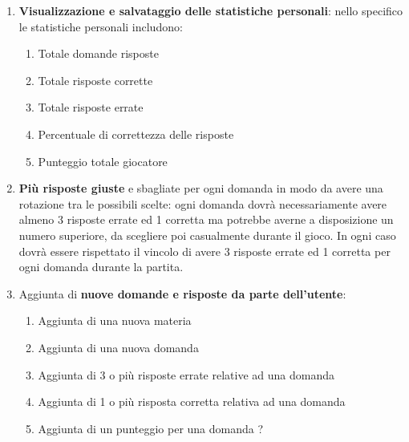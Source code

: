 \begin{enumerate}
            \item \textbf{Visualizzazione e salvataggio delle statistiche personali}: nello specifico le statistiche personali includono:
                \begin{enumerate}
                    \item Totale domande risposte
                    \item Totale risposte corrette
                    \item Totale risposte errate
                    \item Percentuale di correttezza delle risposte
                    \item Punteggio totale giocatore
                \end{enumerate}
            
            \item \textbf{Più risposte giuste} e sbagliate per ogni domanda in modo da avere una rotazione tra le possibili scelte: ogni domanda dovrà necessariamente avere almeno 3 risposte errate ed 1 corretta ma potrebbe averne a disposizione un numero superiore, da scegliere poi casualmente durante il gioco. In ogni caso dovrà essere rispettato il vincolo di avere 3 risposte errate ed 1 corretta per ogni domanda durante la partita.
            
            \item Aggiunta di \textbf{nuove domande e risposte da parte dell’utente}:
                \begin{enumerate}
                        \item Aggiunta di una nuova materia
                        \item Aggiunta di una nuova domanda
                        \item Aggiunta di 3 o più risposte errate relative ad una domanda
                        \item Aggiunta di 1 o più risposta corretta relativa ad una domanda
                        \item Aggiunta di un punteggio per una domanda ?
                    \end{enumerate}
        \end{enumerate}  

    
